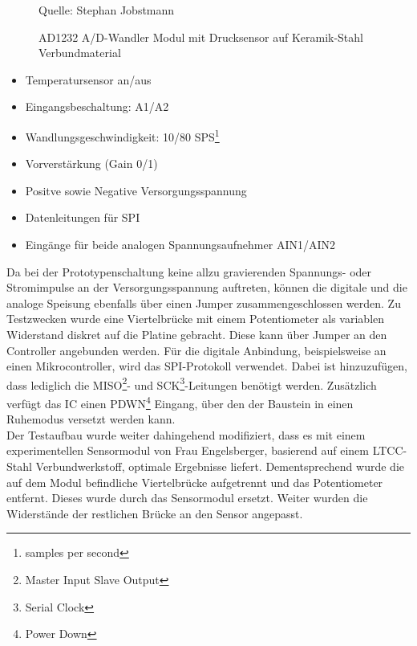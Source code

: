 \documentclass[12pt]{scrreprt} %
\begin{document}
\begin{figure}
\centering
\caption[AD1232 A/D-Wandler Modul mit Drucksensor]{AD1232 A/D-Wandler Modul mit Drucksensor auf Keramik-Stahl Verbundmaterial}
Quelle: Stephan Jobstmann
\label{pic.ad1232}
\end{figure}
\begin{itemize}
\item
Temperatursensor an/aus
\item
Eingangsbeschaltung: A1/A2
\item
Wandlungsgeschwindigkeit: 10/80 SPS\footnote{samples per second}
\item
Vorverstärkung (Gain 0/1)
\item
Positve sowie Negative Versorgungsspannung
\item
Datenleitungen für SPI
\item
Eingänge für beide analogen Spannungsaufnehmer AIN1/AIN2
\end{itemize}
Da bei der Prototypenschaltung keine allzu gravierenden Spannungs- oder Stromimpulse an der Versorgungsspannung auftreten, können die digitale und die analoge Speisung ebenfalls über einen Jumper zusammengeschlossen werden. Zu Testzwecken wurde eine Viertelbrücke mit einem Potentiometer als variablen Widerstand diskret auf die Platine gebracht. Diese kann über Jumper an den Controller angebunden werden. Für die digitale Anbindung, beispielsweise an einen Mikrocontroller, wird das SPI-Protokoll verwendet. Dabei ist hinzuzufügen, dass lediglich die MISO\footnote{Master Input Slave Output}- und SCK\footnote{Serial Clock}-Leitungen benötigt werden. Zusätzlich verfügt das IC einen PDWN\footnote{Power Down} Eingang, über den der Baustein in einen Ruhemodus versetzt werden kann.\\
Der Testaufbau wurde weiter dahingehend modifiziert, dass es mit einem experimentellen Sensormodul von Frau Engelsberger, basierend auf einem LTCC-Stahl Verbundwerkstoff, optimale Ergebnisse liefert. Dementsprechend wurde die auf dem Modul befindliche Viertelbrücke aufgetrennt und das Potentiometer entfernt. Dieses wurde durch das Sensormodul ersetzt. Weiter wurden die Widerstände der restlichen Brücke an den Sensor angepasst.
\end{document}
